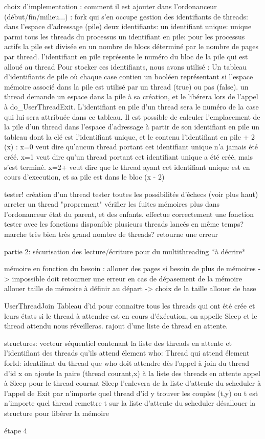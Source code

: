 choix d'implementation :
	comment il est ajouter dans l'ordonanceur (début/fin/milieu...) :
		fork qui s'en occupe
	gestion des identifiants de threads: dans l'espace d'adressage (pile)
		deux identifiants:
			un identifiant unique: unique parmi tous les threads du processus
			un identifiant en pile: pour les processus actifs
				la pile est divisée en un nombre de blocs déterminé par le nombre de pages par thread. l'identifiant en pile représente le numéro du bloc de la pile qui est alloué au thread
		Pour stocker ces identifiants, nous avons utilisé :
			Un tableau d'identifiants de pile où chaque case contien un booléen représentant si l'espace mémoire associé dans la pile est utilisé par un thread (true) ou pas (false). un thread demande un espace dans la pile à sa création, et le libérera lors de l'appel à do_UserThreadExit. L'identifiant en pile d'un thread sera le numéro de la case qui lui sera attribuée dans ce tableau. Il est possible de calculer l'emplacement de la pile d'un thread dans l'espace d'adressage à partir de son identifiant en pile
			un tableau dont la clé est l'identifiant unique, et le contenu l'identifiant en pile + 2 (x) :
				x=0 veut dire qu'aucun thread portant cet identifiant unique n'a jamais été créé.
				x=1 veut dire qu'un thread portant cet identifiant unique a été créé, mais s'est terminé.
				x=2+ veut dire que le thread ayant cet identifiant unique est en cours d'execution, et sa pile est dans le bloc (x - 2)

tester!
	création d'un thread
		tester toutes les possibilités d'échecs (voir plus haut)
	arreter un thread "proprement"
		vérifier les fuites mémoires
		plus dans l'ordonanceur
		état du parent, et des enfants.
	effectue correctement une fonction
		tester avec les fonctions disponible
	plusieurs threads lancés en même temps?	
		marche très bien
	très grand nombre de threads?
		retourne une erreur



partie 2:
	sécurisation des lecture/écriture pour du multithreading
	*à décrire*

	mémoire en fonction du besoin : allouer des pages si besoin de plus de mémoires -> impossible
		doit retourner une erreur en cas de dépasement de la mémoire allouer
		taille de mémoire à définir au départ -> choix de la taille allouer de base

	UserThreadJoin
		Tableau d'id pour connaitre tous les threads qui ont été crée et leurs états
		si le thread à attendre est en cours d'éxécution, on appelle Sleep et le thread
		attendu nous réveilleras.
		rajout d'une liste de thread en attente.

		structures:
			vecteur séquentiel contenant la liste des threads en attente et l'identifiant des threads qu'ils attend
				élement who: Thread qui attend
				élement forId: identifiant du thread que who doit attendre
		dès l'appel à join du thread d'id x
			on ajoute la paire (thread courant,x) à la liste des threads en attente 
			appel à Sleep pour le thread courant
				Sleep l'enlevera de la liste d'attente du scheduler
		à l'appel de Exit par n'importe quel thread d'id y
			trouver les couples (t,y) ou t est n'importe quel thread
			remettre t sur la liste d'attente du scheduler			
			désallouer la structure pour libérer la mémoire

étape 4

